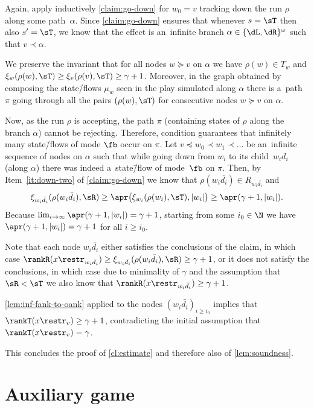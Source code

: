 	Again, apply inductively \cref{claim:go-down} for $w_0=v$ tracking down the run $\rho$ along some path~$\alpha$.
	Since \cref{claim:go-down} ensures that whenever $s=\sT$ then also $s'=\sT$, we know that the effect is an~infinite branch $\alpha\in\{\dL,\dR\}^\omega$ such that $v\prec \alpha$.

	We preserve the invariant that for all nodes $w\succeq v$ on $\alpha$ we have $\rho(w)\in T_w$ and $\xi_w(\rho(w),\sT)\geq\xi_v(\rho(v),\sT)\geq\gamma+1$.
	Moreover, in the graph obtained by composing the state\=/flows $\mu_w$ seen in the play simulated along $\alpha$
	there is a~path $\pi$ going through all the pairs $(\rho(w),\sT)$ for consecutive nodes $w\succeq v$ on $\alpha$.

	Now, as the run $\rho$ is accepting, the path $\pi$ (containing states of $\rho$ along the branch $\alpha$) cannot be rejecting.
	Therefore, condition  guarantees that infinitely many state\=/flows of mode $\fb$ occur on $\pi$.
	Let $v\preceq w_0\prec w_1 \prec \ldots$ be an~infinite sequence of nodes on $\alpha$ such that while going down from $w_i$ to its child~$w_id_i$ (along $\alpha$) there was indeed a~state\=/flow of mode~$\fb$ on $\pi$.
	Then, by Item~\ref{it:down-two} of \cref{claim:go-down} we know that $\rho(w_i\bar{d_i})\in R_{w_i\bar{d_i}}$ and
	\begin{align*}
		\xi_{w_i\bar{d_i}}(\rho(w_i\bar{d_i}),\sR)\geq\apr\big(\xi_{w_i}(\rho(w_i),\sT),|w_i|\big)\geq\apr(\gamma+1,|w_i|).
	\end{align*}
	Because $\lim_{i\to\infty}\apr(\gamma+1,|w_i|)=\gamma+1$, starting from some $i_0\in\N$ we have $\apr(\gamma+1,|w_i|)=\gamma+1$ for all $i\geq i_0$.
	
	Note that each node $w_i\bar{d_i}$ either satisfies the conclusions of the claim, in which case $\rankR(x\restr_{w_i\bar{d_i}})\geq \xi_{w_i\bar{d_i}}(\rho(w_i\bar{d_i}),\sR)\geq\gamma+1$,
	or it does not satisfy the conclusions, in which case due to minimality of $\gamma$ and the assumption that $\sR<\sT$ we also know that $\rankR(x\restr_{w_i\bar{d_i}})\geq \gamma+1$.

	\cref{lem:inf-fank-to-oank} applied to the nodes $(w_i\bar{d_i})_{i\geq i_0}$ implies that
	$\rankT(x\restr_v)\geq \gamma+1$, contradicting the initial assumption that $\rankT(x\restr_v)=\gamma$.

This concludes the proof of \cref{cl:estimate} and therefore also of \cref{lem:soundness}.



\section{Auxiliary game}
\label{sec:aux-game}

